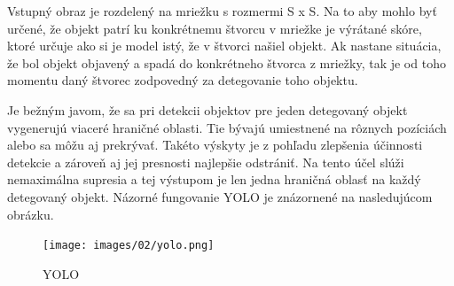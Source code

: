 Vstupný obraz je rozdelený na mriežku s rozmermi S x S. Na to aby mohlo byť určené, že objekt patrí ku konkrétnemu štvorcu v mriežke je výrátané skóre, ktoré určuje ako si je model istý, že v štvorci našiel objekt. Ak nastane situácia, že bol objekt objavený a spadá do konkrétneho štvorca z mriežky, tak je od toho momentu daný štvorec zodpovedný za detegovanie toho objektu.

Je bežným javom, že sa pri detekcii objektov pre jeden detegovaný objekt vygenerujú viaceré hraničné oblasti. Tie bývajú umiestnené na rôznych pozíciách alebo sa môžu aj prekrývať. Takéto výskyty je z pohľadu zlepšenia účinnosti detekcie a zároveň aj jej presnosti najlepšie odstrániť. Na tento účel slúži nemaximálna supresia a tej výstupom je len jedna hraničná oblasť na každý detegovaný objekt. Názorné fungovanie YOLO je znázornené na nasledujúcom obrázku.

\begin{figure}[ht]
    \centering
    \texttt{[image: images/02/yolo.png]}
    \caption{YOLO}
    \label{img:ch2}
\end{figure}


